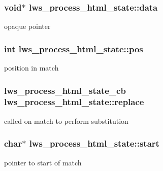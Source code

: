 \subsubsection[{\texorpdfstring{data}{data}}]{\setlength{\rightskip}{0pt plus 5cm}void$\ast$ lws\+\_\+process\+\_\+html\+\_\+state\+::data}\hypertarget{structlws__process__html__state_af21119890fdfebe28fb5c4dabfc1bdf5}{}\label{structlws__process__html__state_af21119890fdfebe28fb5c4dabfc1bdf5}
opaque pointer 
\subsubsection[{\texorpdfstring{pos}{pos}}]{\setlength{\rightskip}{0pt plus 5cm}int lws\+\_\+process\+\_\+html\+\_\+state\+::pos}\hypertarget{structlws__process__html__state_a53234f2948812c7208a256f9f5b23c20}{}\label{structlws__process__html__state_a53234f2948812c7208a256f9f5b23c20}
position in match 
\subsubsection[{\texorpdfstring{replace}{replace}}]{\setlength{\rightskip}{0pt plus 5cm}lws\+\_\+process\+\_\+html\+\_\+state\+\_\+cb lws\+\_\+process\+\_\+html\+\_\+state\+::replace}\hypertarget{structlws__process__html__state_a693d2fb45378afee5da29b539c1ea644}{}\label{structlws__process__html__state_a693d2fb45378afee5da29b539c1ea644}
called on match to perform substitution 
\subsubsection[{\texorpdfstring{start}{start}}]{\setlength{\rightskip}{0pt plus 5cm}char$\ast$ lws\+\_\+process\+\_\+html\+\_\+state\+::start}\hypertarget{structlws__process__html__state_af0732884ef891e24fe5fa237ebaa21a3}{}\label{structlws__process__html__state_af0732884ef891e24fe5fa237ebaa21a3}
pointer to start of match 
